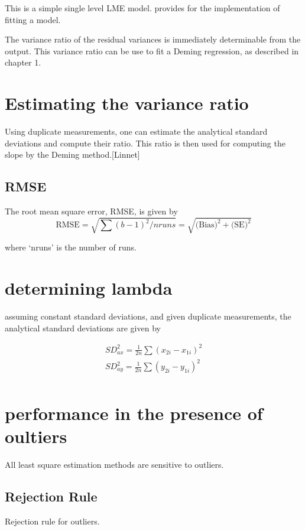\documentclass[Chap3amain.tex]{subfiles}
\begin{document}
This is a simple single level LME model. \citet{pb} provides for
the implementation of fitting a model.

The variance ratio of the residual variances is immediately
determinable from the output. This variance ratio can be use to
fit a Deming regression, as described in chapter 1.


\newpage
\section{Estimating the variance ratio}

Using duplicate measurements, one can estimate the analytical
standard deviations and compute their ratio. This ratio is then
used for computing the slope by the Deming method.[Linnet]

\subsection{RMSE} The root mean square error, RMSE,  is given by
\begin{equation*}
\mbox{RMSE} = \sqrt{\sum{(b-1)^2/nruns}} =
\sqrt{\mbox{(Bias)}^{2}+ \mbox{(SE)}^{2}}
\end{equation*}

where `nruns' is the number of runs.

\section{determining lambda}
assuming constant standard deviations, and given duplicate
measurements, the analytical standard deviations are given by

\begin{eqnarray*}
SD^{2}_{ax} = \frac{1}{2n} \sum (x_{2i} - x_{1i})^{2}\\
SD^{2}_{ay} = \frac{1}{2n} \sum (y_{2i} - y_{1i})^{2}\\
\end{eqnarray*}

\section{performance in the presence of oultiers}
All least square estimation methods are sensitive to outliers.

\subsection{Rejection Rule}
Rejection rule for outliers.
\end{document}

